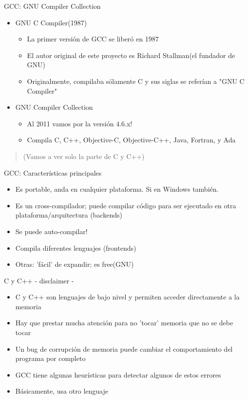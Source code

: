 \documentclass[xetex]{beamer}
\begin{document}
\begin{frame}{GCC: GNU Compiler Collection}
\begin{itemize}
    \item GNU C Compiler(1987)
    \begin{itemize}
      \item La primer versión de GCC se liberó en 1987
      \item El autor original de este  proyecto es Richard Stallman(el fundador de GNU)
      \item Originalmente, compilaba sólamente C y sus siglas se referían a "GNU C Compiler"
    \end{itemize}

    \item GNU Compiler Collection
    \begin{itemize}
      \item Al 2011 vamos por la versión 4.6.x!
      \item Compila C, C++, Objective-C, Objective-C++, Java, Fortran, y Ada
    \end{itemize}
\end{itemize}
\begin{quotation}
(Vamos a ver solo la parte de C y C++)
\end{quotation}
\end{frame}

\begin{frame}{GCC: Características principales} 
\begin{itemize}
  \item Es portable, anda en cualquier plataforma. Si en Windows también.
  \item Es un cross-compilador; puede compilar código para ser ejecutado en otra plataforma/arquitectura (backends)
  \item Se puede auto-compilar!
  \item Compila diferentes lenguajes (frontends)
  \item Otras: 'fácil' de expandir; es free(GNU)
\end{itemize}  
\end{frame}

\begin{frame}{C y C++ - disclaimer -}
\begin{itemize}
  \item C y C++ son lenguajes de bajo nivel y permiten acceder directamente a la memoria
  \item Hay que prestar mucha atención para no 'tocar' memoria que no se debe tocar
  \item Un bug de corrupción de memoria puede cambiar el comportamiento del programa por completo
  \item GCC tiene algunas heurísticas para detectar algunos de estos errores
  \item Básicamente, usa otro lenguaje
\end{itemize}  
\end{frame}
\end{document}
